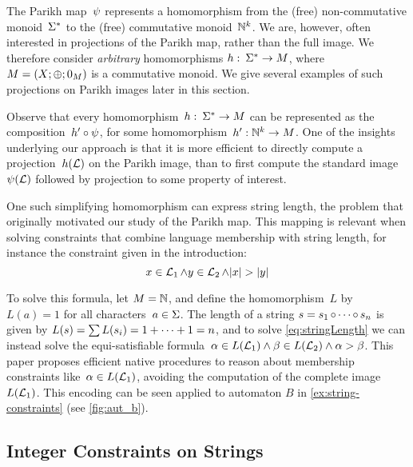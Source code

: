 The Parikh map~$\operatorname{\psi}$ represents a homomorphism from the (free)
non-commutative monoid~$\Sigma^*$ to the (free) commutative
monoid~$\mathbb{N}^k$. We are, however, often interested in projections of the
Parikh map, rather than the full image. We therefore consider \emph{arbitrary}
homomorphisms $h:\: \Sigma^* \to M$, where $M =
\left(X;\operatorname{\oplus};0_{M}\right)$ is a commutative monoid. We give several
examples of such projections on Parikh images later in this section.

Observe that every homomorphism~$h:\: \Sigma^* \to M$ can be
represented as the composition~$h' \circ \operatorname{\psi}$, for some
homomorphism~$h' : \mathbb{N}^k \to M$. One of the insights underlying our
approach is that it is more efficient to directly compute a
projection~$h(\operatorname{\mathcal{L}})$ on the Parikh image, than to first compute the
standard image~$\operatorname{\psi}(\operatorname{\mathcal{L}})$ followed by projection to
some property of interest.


\begin{example}\label{ex:length}
One such simplifying homomorphism can express string
length, the problem that originally motivated our study of the Parikh
map. This mapping is relevant when solving constraints that combine
language membership with string length, for instance the constraint
given in the introduction:
\begin{equation}\label{eq:stringLength}
x \in \operatorname{\mathcal{L}}_1 \wedge y \in \operatorname{\mathcal{L}}_2 \wedge |x| > |y|
\end{equation}

To solve this formula, let
$M = \mathbb{N}$, and define the homomorphism~$L$ by $L(a) = 1$
for all characters~$a \in \Sigma$. The length of a string
$s = s_1 \operatorname{\circ} \cdots \operatorname{\circ} s_n$ is given by
$L(s) = \sum L(s_i) = 1 + \cdots + 1 = n$, and to solve
\eqref{eq:stringLength} we can instead solve the equi-satisfiable
formula~$\alpha \in L(\operatorname{\mathcal{L}}_1) \wedge \beta \in L(\operatorname{\mathcal{L}}_2)
\wedge \alpha > \beta$. This paper proposes efficient native
procedures to reason about membership constraints
like~$\alpha \in L(\operatorname{\mathcal{L}}_1)$, avoiding the computation of
the complete image~$L(\operatorname{\mathcal{L}}_1)$. This encoding can be seen applied to automaton $B$ in
\cref{ex:string-constraints} (see \cref{fig:aut_b}).
\end{example}

\subsection{Integer Constraints on Strings}\label{sec:parikh-automata}

